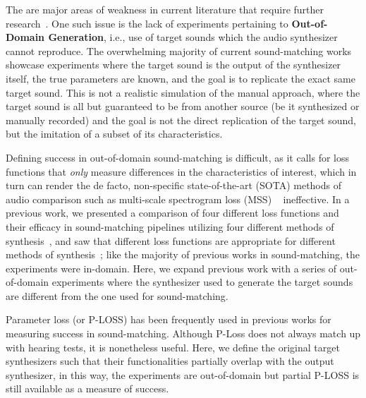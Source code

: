 \documentclass{article} %
\newcommand{\OutDomain}{\textbf{Out-of-Domain Generation}\xspace}
\begin{document}
The are major areas of weakness in current literature that require further research~\cite{salimi2025soundmatching}. One such issue is the lack of experiments pertaining to \OutDomain, i.e., use of target sounds which the audio synthesizer cannot reproduce. The overwhelming majority of current sound-matching works showcase experiments where the target sound is the output of the synthesizer itself, the true parameters are known, and the goal is to replicate the exact same target sound. This is not a realistic simulation of the manual approach, where the target sound is all but guaranteed to be from another source (be it synthesized or manually recorded) and the goal is not the direct replication of the target sound, but the imitation of a subset of its characteristics.

Defining success in out-of-domain sound-matching is difficult, as it calls for loss functions that \textit{only} measure differences in the characteristics of interest, which in turn can render the de facto, non-specific state-of-the-art (SOTA) methods of audio comparison such as multi-scale spectrogram loss (MSS) ~\cite{engel2020ddsp} ineffective. In a previous work, we presented a comparison of four different loss functions and their efficacy in sound-matching pipelines utilizing four different methods of synthesis~\cite{salimi2025soundmatching}, and saw that different loss functions are appropriate for different methods of synthesis~\cite{salimi2025soundmatching}; like the majority of previous works in sound-matching, the experiments were in-domain. Here, we expand previous work with a series of out-of-domain experiments where the synthesizer used to generate the target sounds are different from the one used for sound-matching. 

Parameter loss (or P-LOSS) has been frequently used in previous works for measuring success in sound-matching. Although P-Loss does not always match up with hearing tests, it is nonetheless useful. Here, we define the original target synthesizers such that their functionalities partially overlap with the output synthesizer, in this way, the experiments are out-of-domain but partial P-LOSS is still available as a measure of success. 
\end{document}
